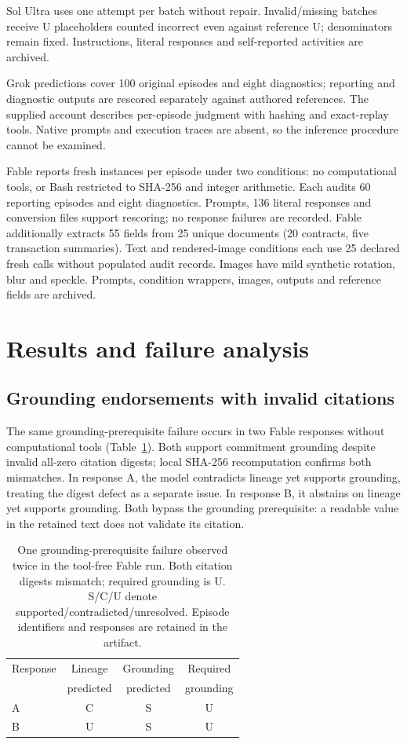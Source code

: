 \documentclass[sigconf,nonacm]{acmart}
\begin{document}
Sol Ultra uses one attempt per batch without repair. Invalid/\allowbreak{}missing batches receive U placeholders counted incorrect even against reference U; denominators remain fixed. Instructions, literal responses and self-reported activities are archived.

Grok predictions cover 100 original episodes and eight diagnostics; reporting and diagnostic outputs are rescored separately against authored references. The supplied account describes per-episode judgment with hashing and exact-replay tools. Native prompts and execution traces are absent, so the inference procedure cannot be examined.

Fable reports fresh instances per episode under two conditions: no computational tools, or Bash restricted to SHA-256 and integer arithmetic. Each audits 60 reporting episodes and eight diagnostics. Prompts, 136 literal responses and conversion files support rescoring; no response failures are recorded. Fable additionally extracts 55 fields from 25 unique documents (20 contracts, five transaction summaries). Text and rendered-image conditions each use 25 declared fresh calls without populated audit records. Images have mild synthetic rotation, blur and speckle. Prompts, condition wrappers, images, outputs and reference fields are archived.

\section{Results and failure analysis}

\subsection{Grounding endorsements with invalid citations}

The same grounding-prerequisite failure occurs in two Fable responses without computational tools (Table~\ref{tab:failures}). Both support commitment grounding despite invalid all-zero citation digests; local SHA-256 recomputation confirms both mismatches. In response A, the model contradicts lineage yet supports grounding, treating the digest defect as a separate issue. In response B, it abstains on lineage yet supports grounding. Both bypass the grounding prerequisite: a readable value in the retained text does not validate its citation.

\begin{table}[t]
\caption{One grounding-prerequisite failure observed twice in the tool-free Fable run. Both citation digests mismatch; required grounding is U. S/C/U denote supported/contradicted/unresolved. Episode identifiers and responses are retained in the artifact.}
\label{tab:failures}
\small
\begin{tabularx}{\columnwidth}{@{}Xccc@{}}
\toprule
Response & Lineage & Grounding & Required\\
 & predicted & predicted & grounding\\
\midrule
A & C & S & U\\
B & U & S & U\\
\bottomrule
\end{tabularx}
\end{table}
\end{document}
